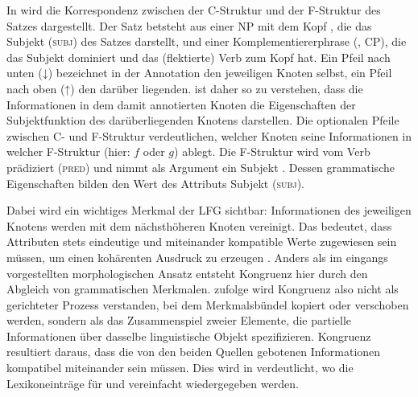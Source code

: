 In  wird die Korrespondenz zwischen der C-Struktur und der
F-Struktur des Satzes  dargestellt. Der Satz betsteht aus einer
NP mit dem Kopf , die das Subjekt (\textsc{subj}) des Satzes
darstellt, und einer Komplementiererphrase (, CP),
die das Subjekt dominiert und das (flektierte) Verb  zum Kopf hat.
Ein Pfeil nach unten (↓) bezeichnet in der Annotation den jeweiligen Knoten
selbst, ein Pfeil nach oben (↑) den darüber liegenden.  ist
daher so zu verstehen, dass die Informationen in dem damit annotierten Knoten
die Eigenschaften der Subjekt\-funk\-tion des darüberliegenden Knotens
darstellen. Die optionalen Pfeile zwischen C- und F-Struktur verdeutlichen,
welcher Knoten seine Informationen in welcher F-Struktur (hier: $f$ oder $g$)
ablegt. Die F-Struktur wird vom Verb  prädiziert (\textsc{pred}) und
nimmt als Argument ein Subjekt . Dessen grammatische Eigenschaften
bilden den Wert des Attributs Subjekt (\textsc{subj}).

Dabei wird ein wichtiges Merkmal der LFG sichtbar: Informationen des jeweiligen
Knotens werden mit dem nächsthöheren Knoten vereinigt. Das bedeutet, dass
Attributen stets eindeutige und miteinander kompatible Werte zugewiesen sein
müssen, um einen kohärenten Ausdruck zu erzeugen
\autocite[vgl.][43--54]{bresnanetal2016}. Anders als im eingangs vorgestellten
morphologischen Ansatz entsteht Kongruenz hier durch den Abgleich von
grammatischen Merkmalen. \citet[7]{wechslerzlatic2003} zufolge wird Kongruenz
also nicht als gerichteter Prozess verstanden, bei dem Merkmalsbündel kopiert
oder verschoben werden, sondern als das Zusammenspiel zweier Elemente, die
partielle Informationen über dasselbe linguistische Objekt spezifizieren.
Kongruenz resultiert daraus, dass die von den beiden Quellen gebotenen
Informationen kompatibel miteinander sein müssen.
Dies wird in  verdeutlicht, wo die Lexikoneinträge für
 und  vereinfacht wiedergegeben werden.

